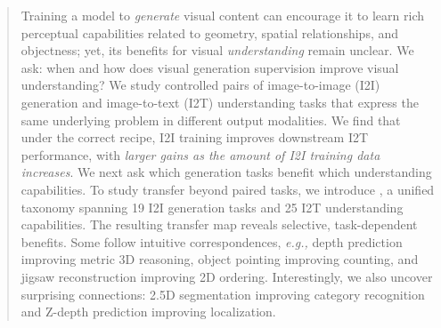 \begin{abstract}
Training a model to \textit{generate} visual content
can encourage it to learn rich perceptual capabilities related to
geometry, spatial relationships, and objectness;
yet, its benefits for visual \textit{understanding} remain unclear.
We ask: when and how does visual generation supervision improve visual understanding?
We study controlled pairs of image-to-image (I2I) generation and
image-to-text (I2T) understanding tasks that express the same underlying problem in different output modalities. 
We find that under the correct recipe, I2I training improves downstream I2T performance, with \textit{larger gains as the amount of I2I training data increases}.
We next ask which generation tasks benefit which understanding capabilities. To study transfer beyond paired tasks, we introduce \methodname, a unified taxonomy spanning 19 I2I generation tasks and 25 I2T understanding capabilities. The resulting transfer map reveals selective, task-dependent benefits. Some follow intuitive correspondences, \textit{e.g.,} depth prediction improving metric 3D reasoning, object pointing improving counting, and jigsaw reconstruction improving 2D ordering. 
Interestingly, we also uncover surprising connections: 2.5D segmentation improving category recognition and Z-depth prediction improving localization. 

\end{abstract}
